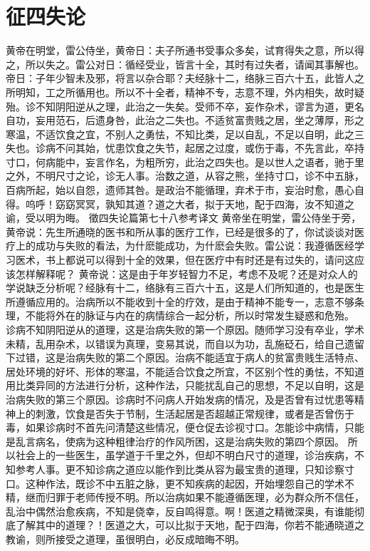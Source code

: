 \documentclass[a4paper,12pt,UTF8,twoside]{ctexbook}
\begin{document}
\chapter{征四失论}
黄帝在明堂，雷公侍坐，黄帝日：夫子所通书受事众多矣，试育得失之意，所以得之，所以失之。雷公对日：循经受业，皆言十全，其时有过失者，请闻其事解也。帝日：子年少智未及邪，将言以杂合耶？夫经脉十二，络脉三百六十五，此皆人之所明知，工之所循用也。所以不十全者，精神不专，志意不理，外内相失，故时疑殆。诊不知阴阳逆从之理，此治之一失矣。受师不卒，妄作杂术，谬言为道，更名自功，妄用范石，后遗身咎，此治之二失也。不适贫富贵贱之居，坐之薄厚，形之寒温，不适饮食之宜，不别人之勇怯，不知比类，足以自乱，不足以自明，此之三失也。诊病不问其始，忧患饮食之失节，起居之过度，或伤于毒，不先言此，卒持寸口，何病能中，妄言作名，为粗所穷，此治之四失也。是以世人之语者，驰于里之外，不明尺寸之论，诊无人事。治数之道，从容之熊，坐持寸口，诊不中五脉，百病所起，始以自怨，遗师其咎。是政治不能循理，弃术于市，妄治时愈，愚心自得。呜呼！窈窈冥冥，孰知其道？道之大者，拟于天地，配于四海，汝不知道之谕，受以明为晦。
徵四失论篇第七十八参考译文
黄帝坐在明堂，雷公侍坐于旁，黄帝说：先生所通晓的医书和所从事的医疗工作，已经是很多的了，你试谈谈对医疗上的成功与失败的看法，为什麽能成功，为什麽会失败。雷公说：我遵循医经学习医术，书上都说可以得到十全的效果，但在医疗中有时还是有过失的，请问这应该怎样解释呢？
黄帝说：这是由于年岁轻智力不足，考虑不及呢？还是对众人的学说缺乏分析呢？经脉有十二，络脉有三百六十五，这是人们所知道的，也是医生所遵循应用的。治病所以不能收到十全的疗效，是由于精神不能专一，志意不够条理，不能将外在的脉证与内在的病情综合一起分析，所以时常发生疑惑和危殆。
诊病不知阴阳逆从的道理，这是治病失败的第一个原因。随师学习没有卒业，学术未精，乱用杂术，以错误为真理，变易其说，而自以为功，乱施砭石，给自己遗留下过错，这是治病失败的第二个原因。治病不能适宜于病人的贫富贵贱生活特点、居处环境的好坏、形体的寒温，不能适合饮食之所宜，不区别个性的勇怯，不知道用比类异同的方法进行分析，这种作法，只能扰乱自己的思想，不足以自明，这是治病失败的第三个原因。诊病时不问病人开始发病的情况，及是否曾有过忧患等精神上的刺激，饮食是否失于节制，生活起居是否超越正常规律，或者是否曾伤于毒，如果诊病时不首先问清楚这些情况，便仓促去诊视寸口。怎能诊中病情，只能是乱言病名，使病为这种粗律治疗的作风所困，这是治病失败的第四个原因。
所以社会上的一些医生，虽学道于千里之外，但却不明白尺寸的道理，诊治疾病，不知参考人事。更不知诊病之道应以能作到比类从容为最宝贵的道理，只知诊察寸口。这种作法，既诊不中五脏之脉，更不知疾病的起因，开始埋怨自己的学术不精，继而归罪于老师传授不明。所以治病如果不能遵循医理，必为群众所不信任，乱治中偶然治愈疾病，不知是侥幸，反自鸣得意。啊！医道之精微深奥，有谁能彻底了解其中的道理？！医道之大，可以比拟于天地，配于四海，你若不能通晓道之教谕，则所接受之道理，虽很明白，必反成暗晦不明。
\end{document}
